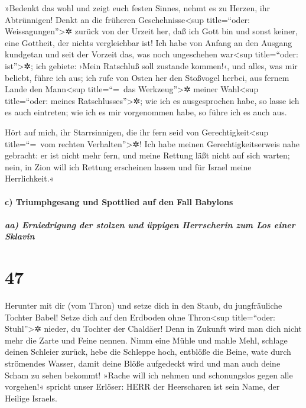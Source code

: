 »Bedenkt das wohl und zeigt euch festen Sinnes, nehmt es
zu Herzen, ihr Abtrünnigen! Denkt an die früheren
Geschehnisse\textless sup title=``oder: Weissagungen''\textgreater✲
zurück von der Urzeit her, daß ich Gott bin und sonst keiner, eine
Gottheit, der nichts vergleichbar ist! Ich habe von
Anfang an den Ausgang kundgetan und seit der Vorzeit das, was noch
ungeschehen war\textless sup title=``oder: ist''\textgreater✲; ich
gebiete: ›Mein Ratschluß soll zustande kommen!‹, und alles, was mir
beliebt, führe ich aus; ich rufe von Osten her den
Stoßvogel herbei, aus fernem Lande den Mann\textless sup title=``=~das
Werkzeug''\textgreater✲ meiner Wahl\textless sup title=``oder: meines
Ratschlusses''\textgreater✲; wie ich es ausgesprochen habe, so lasse ich
es auch eintreten; wie ich es mir vorgenommen habe, so führe ich es auch
aus.

Hört auf mich, ihr Starrsinnigen, die ihr fern seid von
Gerechtigkeit\textless sup title=``=~vom rechten
Verhalten''\textgreater✲! Ich habe meinen
Gerechtigkeitserweis nahe gebracht: er ist nicht mehr fern, und meine
Rettung läßt nicht auf sich warten; nein, in Zion will ich Rettung
erscheinen lassen und für Israel meine Herrlichkeit.«

\hypertarget{c-triumphgesang-und-spottlied-auf-den-fall-babylons}{%
\paragraph{c) Triumphgesang und Spottlied auf den Fall
Babylons}\label{c-triumphgesang-und-spottlied-auf-den-fall-babylons}}

\hypertarget{aa-erniedrigung-der-stolzen-und-uxfcppigen-herrscherin-zum-los-einer-sklavin}{%
\subparagraph{aa) Erniedrigung der stolzen und üppigen Herrscherin zum
Los einer
Sklavin}\label{aa-erniedrigung-der-stolzen-und-uxfcppigen-herrscherin-zum-los-einer-sklavin}}

\hypertarget{section-46}{%
\section{47}\label{section-46}}

Herunter mit dir (vom Thron) und setze dich in den Staub,
du jungfräuliche Tochter Babel! Setze dich auf den Erdboden ohne
Thron\textless sup title=``oder: Stuhl''\textgreater✲ nieder, du Tochter
der Chaldäer! Denn in Zukunft wird man dich nicht mehr die Zarte und
Feine nennen. Nimm eine Mühle und mahle Mehl, schlage
deinen Schleier zurück, hebe die Schleppe hoch, entblöße die Beine, wate
durch strömendes Wasser, damit deine Blöße aufgedeckt wird
und man auch deine Scham zu sehen bekommt! »Rache will ich nehmen und
schonungslos gegen alle vorgehen!« spricht unser Erlöser:
HERR der Heerscharen ist sein Name, der Heilige Israels.

